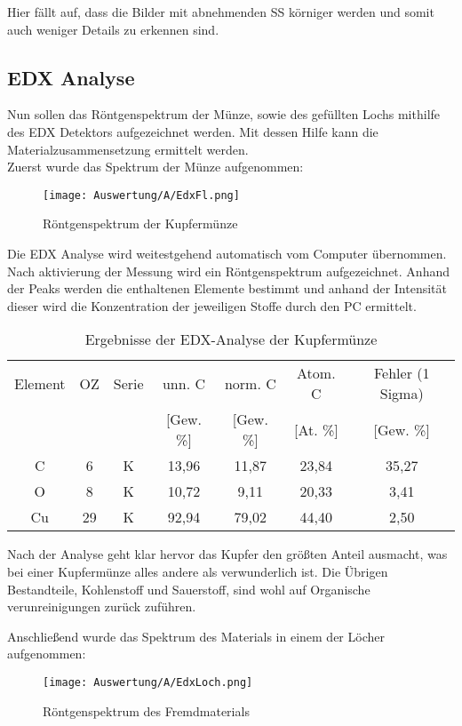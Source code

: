Hier fällt auf, dass die Bilder mit abnehmenden SS körniger werden und somit auch weniger Details zu erkennen sind.

\newpage
\subsection{EDX Analyse}

Nun sollen das Röntgenspektrum der Münze, sowie des gefüllten Lochs mithilfe des EDX Detektors aufgezeichnet werden. Mit dessen Hilfe kann die Materialzusammensetzung ermittelt werden. \\

Zuerst wurde das Spektrum der Münze aufgenommen: 
\begin{figure}[h]
    \centering
    \texttt{[image: Auswertung/A/EdxFl.png]}
    \caption{Röntgenspektrum der Kupfermünze}
\end{figure}

Die EDX Analyse wird weitestgehend automatisch vom Computer übernommen. Nach aktivierung der Messung wird ein Röntgenspektrum aufgezeichnet. Anhand der Peaks werden die enthaltenen Elemente bestimmt und anhand der Intensität dieser wird die Konzentration der jeweiligen Stoffe durch den PC ermittelt.

\begin{table}[h]
    \centering
    \begin{tabular}{c|c|c|c|c|c|c}
        Element & OZ &Serie& unn. C & norm. C &  Atom. C  & Fehler (1 Sigma) \\
         & & & [Gew. \%] & [Gew. \%] & [At. \%] & [Gew. \%] \\
        \hline\hline
        C & 6 & K & 13,96&11,87&23,84 & 35,27\\
        O & 8 & K & 10,72&9,11&20,33 & 3,41\\
        Cu & 29 & K & 92,94&79,02&44,40 & 2,50\\
    \end{tabular}
    \caption{Ergebnisse der EDX-Analyse der Kupfermünze}
\end{table}

Nach der Analyse geht klar hervor das Kupfer den größten Anteil ausmacht, was bei einer Kupfermünze alles andere als verwunderlich ist. Die Übrigen Bestandteile, Kohlenstoff und Sauerstoff, sind wohl auf Organische verunreinigungen zurück zuführen.

\newpage
Anschließend wurde das Spektrum des Materials in einem der Löcher aufgenommen: 
\begin{figure}[h]
    \centering
    \texttt{[image: Auswertung/A/EdxLoch.png]}
    \caption{Röntgenspektrum des Fremdmaterials}
\end{figure}


